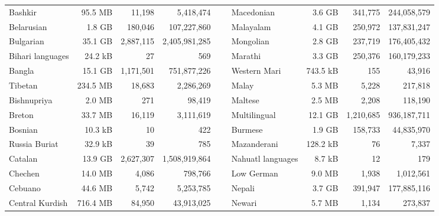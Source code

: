 \begin{table}[ht!]
{\begin{tabular}{lrrrclrrr}
            Bashkir                     & 95.5 MB   & 11,198      & 5,418,474       & ~ & Macedonian        & 3.6 GB    & 341,775    & 244,058,579    \\
            Belarusian                  & 1.8 GB    & 180,046     & 107,227,860     & ~ & Malayalam         & 4.1 GB    & 250,972    & 137,831,247    \\
            Bulgarian                   & 35.1 GB   & 2,887,115   & 2,405,981,285   & ~ & Mongolian         & 2.8 GB    & 237,719    & 176,405,432    \\
            Bihari languages            & 24.2 kB   & 27          & 569             & ~ & Marathi           & 3.3 GB    & 250,376    & 160,179,233    \\
            Bangla                      & 15.1 GB   & 1,171,501   & 751,877,226     & ~ & Western Mari      & 743.5 kB  & 155        & 43,916         \\
            Tibetan                     & 234.5 MB  & 18,683      & 2,286,269       & ~ & Malay             & 5.3 MB    & 5,228      & 217,818        \\
            Bishnupriya                 & 2.0 MB    & 271         & 98,419          & ~ & Maltese           & 2.5 MB    & 2,208      & 118,190        \\
            Breton                      & 33.7 MB   & 16,119      & 3,111,619       & ~ & Multilingual      & 12.1 GB   & 1,210,685  & 936,187,711    \\
            Bosnian                     & 10.3 kB   & 10          & 422             & ~ & Burmese           & 1.9 GB    & 158,733    & 44,835,970     \\
            Russia Buriat               & 32.9 kB   & 39          & 785             & ~ & Mazanderani       & 128.2 kB  & 76         & 7,337          \\
            Catalan                     & 13.9 GB   & 2,627,307   & 1,508,919,864   & ~ & Nahuatl languages & 8.7 kB    & 12         & 179            \\
            Chechen                     & 14.0 MB   & 4,086       & 798,766         & ~ & Low German        & 9.0 MB    & 1,938      & 1,012,561      \\
            Cebuano                     & 44.6 MB   & 5,742       & 5,253,785       & ~ & Nepali            & 3.7 GB    & 391,947    & 177,885,116    \\
            Central Kurdish             & 716.4 MB  & 84,950      & 43,913,025      & ~ & Newari            & 5.7 MB    & 1,134      & 273,837        \\

\end{tabular}}
\end{table}

